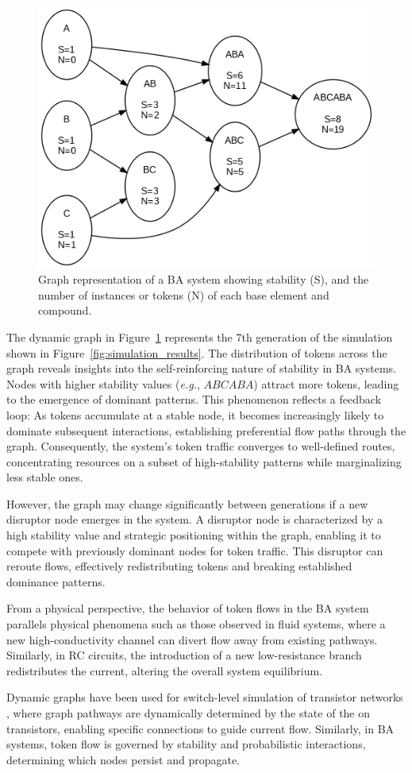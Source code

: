 \documentclass[entropy,article,submit,pdftex,moreauthors]{Definitions/mdpi}
\begin{document}
\begin{figure}[h]
    \centering
    \includegraphics[width=0.5\linewidth]{abc_graph.png}
    \caption{Graph representation of a BA system showing stability (S), and the number of instances or tokens (N) of each base element and compound.}
    \label{fig:abc_sim}
\end{figure}

The dynamic graph in Figure~\ref{fig:abc_sim} represents the 7th generation of the simulation shown in Figure~\ref{fig:simulation_results}. The distribution of tokens across the graph reveals insights into the self-reinforcing nature of stability in BA systems. Nodes with higher stability values (\textit{e.g.}, $ABCABA$) attract more tokens, leading to the emergence of dominant patterns. This phenomenon reflects a feedback loop: As tokens accumulate at a stable node, it becomes increasingly likely to dominate subsequent interactions, establishing preferential flow paths through the graph. Consequently, the system's token traffic converges to well-defined routes, concentrating resources on a subset of high-stability patterns while marginalizing less stable ones.

However, the graph may change significantly between generations if a new disruptor node emerges in the system. A disruptor node is characterized by a high stability value and strategic positioning within the graph, enabling it to compete with previously dominant nodes for token traffic. This disruptor can reroute flows, effectively redistributing tokens and breaking established dominance patterns. 

From a physical perspective, the behavior of token flows in the BA system parallels physical phenomena such as those observed in fluid systems, where a new high-conductivity channel can divert flow away from existing pathways. Similarly, in RC circuits, the introduction of a new low-resistance branch redistributes the current, altering the overall system equilibrium. 

Dynamic graphs have been used for switch-level simulation of transistor networks \cite{AdlerCAD}, where graph pathways are dynamically determined by the state of the on transistors, enabling specific connections to guide current flow. Similarly, in BA systems, token flow is governed by stability and probabilistic interactions, determining which nodes persist and propagate.
\end{document}
